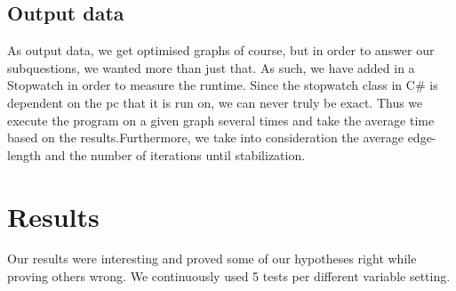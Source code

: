 \documentclass[a4paper,12pt]{article}
\begin{document}
\subsection{Output data}
As output data, we get optimised graphs of course, but in order to answer our subquestions, we wanted more than just that. As such, we have added in a Stopwatch in order to measure the runtime. Since the stopwatch class in C\# is dependent on the pc that it is run on, we can never truly be exact. Thus we execute the program on a given graph several times and take the average time based on the results.Furthermore, we take into consideration the average edge-length and the number of iterations until stabilization.

\section{Results}\label{s:results}
Our results were interesting and proved some of our hypotheses right while proving others wrong. We continuously used 5 tests per different variable setting.
\end{document}
